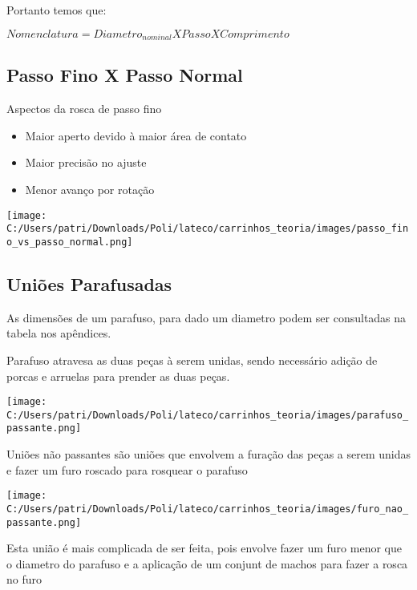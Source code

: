 Portanto temos que:

$\boxed{Nomenclatura = Diametro_{nominal}XPassoXComprimento}$

\subsection{Passo Fino X Passo Normal}

Aspectos da rosca de passo fino

\begin{itemize}
	\item Maior aperto devido à maior área de contato
	\item Maior precisão no ajuste
	\item Menor avanço por rotação
\end{itemize}

\begin{center}
\texttt{[image: C:/Users/patri/Downloads/Poli/lateco/carrinhos\_teoria/images/passo\_fino\_vs\_passo\_normal.png]}\\
\end{center}

\subsection{Uniões Parafusadas}

As dimensões de um parafuso, para dado um diametro podem ser consultadas na tabela nos apêndices.

\begin{namedtheorem}
	Parafuso atravesa as duas peças à serem unidas, sendo necessário adição de porcas e arruelas para prender as duas peças.
	\begin{center}
	\texttt{[image: C:/Users/patri/Downloads/Poli/lateco/carrinhos\_teoria/images/parafuso\_passante.png]}\\
	\end{center}
\end{namedtheorem}

\begin{namedtheorem}
	Uniões não passantes são uniões que envolvem a furação das peças a serem unidas e fazer um furo roscado para rosquear o parafuso
	\begin{center}
	\texttt{[image: C:/Users/patri/Downloads/Poli/lateco/carrinhos\_teoria/images/furo\_nao\_passante.png]}\\
	\end{center}
	Esta união é mais complicada de ser feita, pois envolve fazer um furo menor que o diametro do parafuso e a aplicação de um conjunt de machos para fazer a rosca no furo
\end{namedtheorem}

